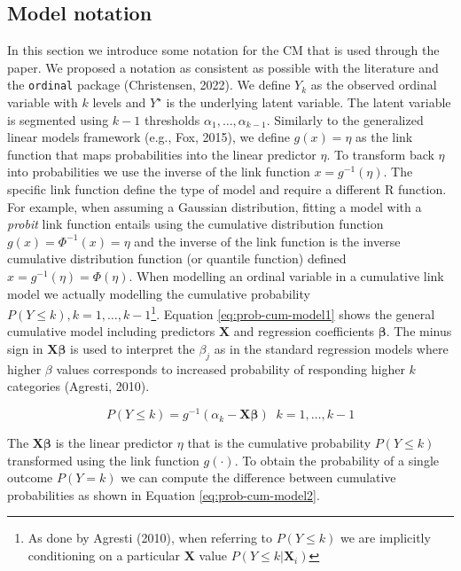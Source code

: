 \documentclass[
  man, mask,floatsintext]{apa6}
\begin{document}
\subsection{Model notation}\label{model-notation}

In this section we introduce some notation for the CM that is used through the paper. We proposed a notation as consistent as possible with the literature and the \texttt{ordinal} package (Christensen, 2022). We define \(Y_k\) as the observed ordinal variable with \(k\) levels and \(Y^\star\) is the underlying latent variable. The latent variable is segmented using \(k - 1\) thresholds \(\alpha_1, \dots, \alpha_{k - 1}\). Similarly to the generalized linear models framework (e.g., Fox, 2015), we define \(g(x) = \eta\) as the link function that maps probabilities into the linear predictor \(\eta\). To transform back \(\eta\) into probabilities we use the inverse of the link function \(x = g^{-1}(\eta)\). The specific link function define the type of model and require a different R function. For example, when assuming a Gaussian distribution, fitting a model with a \emph{probit} link function entails using the cumulative distribution function \(g(x) = \Phi^{-1}(x) = \eta\) and the inverse of the link function is the inverse cumulative distribution function (or quantile function) defined \(x = g^{-1}(\eta) = \Phi(\eta)\). When modelling an ordinal variable in a cumulative link model we actually modelling the cumulative probability \(P(Y \leq k), k = 1, \dots, k - 1\)\footnote{As done by Agresti (2010), when referring to \(P(Y \leq k)\) we are implicitly conditioning on a particular \(\mathbf{X}\) value \(P(Y \leq k | \mathbf{X}_i)\)}. Equation \eqref{eq:prob-cum-model1} shows the general cumulative model including predictors \(\mathbf{X}\) and regression coefficients \(\boldsymbol{\beta}\). The minus sign in \(\mathbf{X} \boldsymbol{\beta}\) is used to interpret the \(\beta_j\) as in the standard regression models where higher \(\beta\) values corresponds to increased probability of responding higher \(k\) categories (Agresti, 2010).

\begin{equation}
P(Y \leq k) = g^{-1}(\alpha_k - \mathbf{X} \boldsymbol{\beta}) \;\;k = 1, \dots, k - 1
\label{eq:prob-cum-model1}
\end{equation}

The \(\mathbf{X} \boldsymbol{\beta}\) is the linear predictor \(\eta\) that is the cumulative probability \(P(Y \leq k)\) transformed using the link function \(g(\cdot)\). To obtain the probability of a single outcome \(P(Y = k)\) we can compute the difference between cumulative probabilities as shown in Equation \eqref{eq:prob-cum-model2}.
\end{document}
